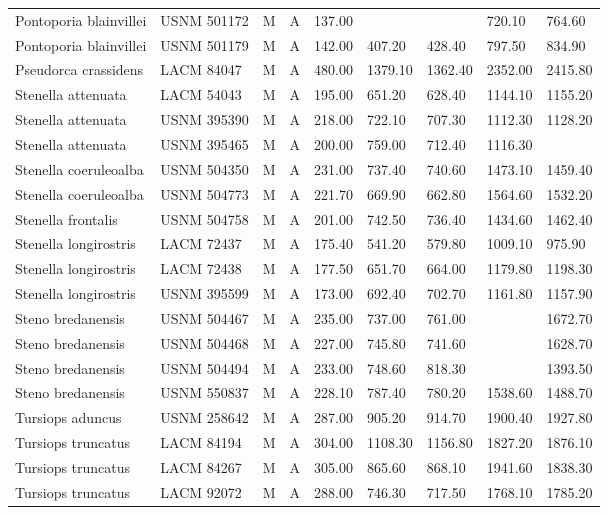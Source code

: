 \begin{longtable}{|p{1in}p{.8in}p{.25in}p{.25in}p{.5in}p{.5in}p{.5in}p{.5in}p{.55in}|}
  Pontoporia blainvillei & USNM 501172 & M & A & 137.00 &  &  & 720.10 & 764.60 \\ 
  Pontoporia blainvillei & USNM 501179 & M & A & 142.00 & 407.20 & 428.40 & 797.50 & 834.90 \\ 
  Pseudorca crassidens & LACM 84047 & M & A & 480.00 & 1379.10 & 1362.40 & 2352.00 & 2415.80 \\ 
  Stenella attenuata & LACM 54043 & M & A & 195.00 & 651.20 & 628.40 & 1144.10 & 1155.20 \\ 
  Stenella attenuata & USNM 395390 & M & A & 218.00 & 722.10 & 707.30 & 1112.30 & 1128.20 \\ 
  Stenella attenuata & USNM 395465 & M & A & 200.00 & 759.00 & 712.40 & 1116.30 &  \\ 
  Stenella coeruleoalba & USNM 504350 & M & A & 231.00 & 737.40 & 740.60 & 1473.10 & 1459.40 \\ 
  Stenella coeruleoalba & USNM 504773 & M & A & 221.70 & 669.90 & 662.80 & 1564.60 & 1532.20 \\ 
  Stenella frontalis & USNM 504758 & M & A & 201.00 & 742.50 & 736.40 & 1434.60 & 1462.40 \\ 
  Stenella longirostris & LACM 72437 & M & A & 175.40 & 541.20 & 579.80 & 1009.10 & 975.90 \\ 
  Stenella longirostris & LACM 72438 & M & A & 177.50 & 651.70 & 664.00 & 1179.80 & 1198.30 \\ 
  Stenella longirostris & USNM 395599 & M & A & 173.00 & 692.40 & 702.70 & 1161.80 & 1157.90 \\ 
  Steno bredanensis & USNM 504467 & M & A & 235.00 & 737.00 & 761.00 &  & 1672.70 \\ 
  Steno bredanensis & USNM 504468 & M & A & 227.00 & 745.80 & 741.60 &  & 1628.70 \\ 
  Steno bredanensis & USNM 504494 & M & A & 233.00 & 748.60 & 818.30 &  & 1393.50 \\ 
  Steno bredanensis & USNM 550837 & M & A & 228.10 & 787.40 & 780.20 & 1538.60 & 1488.70 \\ 
  Tursiops aduncus & USNM 258642 & M & A & 287.00 & 905.20 & 914.70 & 1900.40 & 1927.80 \\ 
  Tursiops truncatus & LACM 84194 & M & A & 304.00 & 1108.30 & 1156.80 & 1827.20 & 1876.10 \\ 
  Tursiops truncatus & LACM 84267 & M & A & 305.00 & 865.60 & 868.10 & 1941.60 & 1838.30 \\ 
  Tursiops truncatus & LACM 92072 & M & A & 288.00 & 746.30 & 717.50 & 1768.10 & 1785.20 \\ 

\end{longtable}
